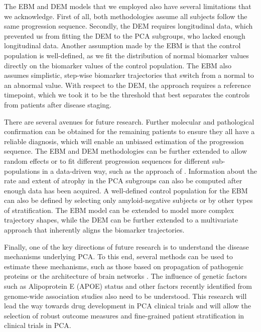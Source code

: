 The EBM and DEM models that we employed also have several limitations that we acknowledge. First of all, both methodologies assume all subjects follow the same progression sequence. Secondly, the DEM requires longitudinal data, which prevented us from fitting the DEM to the PCA subgroups, who lacked enough longitudinal data. Another assumption made by the EBM is that the control population is well-defined, as we fit the distribution of normal biomarker values directly on the biomarker values of the control population. The EBM also assumes simplistic, step-wise biomarker trajectories that switch from a normal to an abnormal value. With respect to the DEM, the approach requires a reference timepoint, which we took it to be the threshold that best separates the controls from patients after disease staging.  

There are several avenues for future research. Further molecular and pathological confirmation can be obtained for the remaining patients to ensure they all have a reliable diagnosis, which will enable an unbiased estimation of the progression sequence. The EBM and DEM methodologies can be further extended to allow random effects or to fit different progression sequences for different sub-populations in a data-driven way, such as the approach of \cite{young2015multiple}. Information about the rate and extent of atrophy in the PCA subgroups can also be computed after enough data has been acquired. A well-defined control population for the EBM can also be defined by selecting only amyloid-negative subjects or by other types of stratification. The EBM model can be extended to model more complex trajectory shapes, while the DEM can be further extended to a multivariate approach that inherently aligns the biomarker trajectories.

Finally, one of the key directions of future research is to understand the disease mechanisms underlying PCA. To this end, several methods can be used to estimate these mechanisms, such as those based on propagation of pathogenic proteins \cite{raj2012network, georgiadis2018computational} or the architecture of brain networks \cite{zhou2012predicting}. The influence of genetic factors such as Alipoprotein E (APOE) status \cite{schott2006apolipoprotein, snowden2007cognitive} and other factors recently identified \cite{schott2016genetic, schott2006apolipoprotein} from genome-wide association studies also need to be understood. This research will lead the way towards drug development in PCA clinical trials and will allow the selection of robust outcome measures and fine-grained patient stratification in clinical trials in PCA. 

